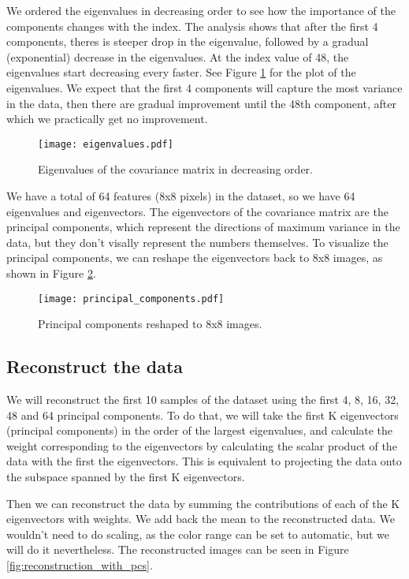 \documentclass{article}
\begin{document}
We ordered the eigenvalues in decreasing order to see
how the importance of the components changes with the index.
The analysis shows that after the first 4 components,
theres is steeper drop in the eigenvalue,
followed by a gradual (exponential) decrease in the eigenvalues.
At the index value of 48, the eigenvalues start decreasing every faster.
See Figure \ref{fig:eigenvalues} for the plot of the eigenvalues.
We expect that the first 4 components will capture the most variance in the data,
then there are gradual improvement until the 48th component,
after which we practically get no improvement.

\begin{figure}[ht!]
    \centering
    \texttt{[image: eigenvalues.pdf]}
    \caption{Eigenvalues of the covariance matrix in decreasing order.}
    \label{fig:eigenvalues}
\end{figure}

We have a total of 64 features (8x8 pixels) in the dataset,
so we have 64 eigenvalues and eigenvectors.
The eigenvectors of the covariance matrix are the principal components,
which represent the directions of maximum variance in the data,
but they don't visally represent the numbers themselves.
To visualize the principal components,
we can reshape the eigenvectors back to 8x8 images, as shown in Figure \ref{fig:principal_components}.

\begin{figure}[ht!]
    \centering
    \texttt{[image: principal\_components.pdf]}
    \caption{Principal components reshaped to 8x8 images.}
    \label{fig:principal_components}
\end{figure}

\subsection{Reconstruct the data}
We will reconstruct the first 10 samples of the dataset using the first
4, 8, 16, 32, 48 and 64 principal components.
To do that, we will take the first K eigenvectors (principal components)
in the order of the largest eigenvalues,
and calculate the weight corresponding to the eigenvectors
by calculating the scalar product of the data with the first the eigenvectors.
This is equivalent to projecting the data onto the subspace spanned by the first K eigenvectors.

Then we can reconstruct the data by
summing the contributions of each of the K eigenvectors with weights.
We add back the mean to the reconstructed data.
We wouldn't need to do scaling, as the color range can be set to automatic,
but we will do it nevertheless.
The reconstructed images can be seen in Figure \ref{fig:reconstruction_with_pcs}.
\end{document}

